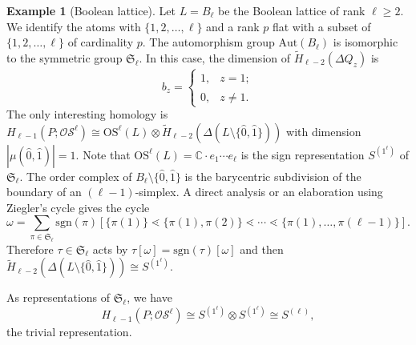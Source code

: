 \documentclass{amsart}
\numberwithin{equation}{section}
\theoremstyle{plain}
\theoremstyle{remark}
\theoremstyle{definition}
\newtheorem{ex}[thm]{Example}
\numberwithin{equation}{section}
\newcommand{\C}{\mathbb{C}}
\newcommand{\OS}{\mathrm{OS}}
\newcommand{\sOS}{\mathscr{OS}}
\begin{document}
\begin{ex}[Boolean lattice]
    Let $L=B_\ell$ be the Boolean lattice of rank $\ell\geq 2$. We identify the atoms with $\{1,2,\ldots,\ell\}$ and a rank $p$ flat with a subset of $\{1,2,\ldots,\ell\}$ of cardinality $p$. The automorphism group $\mathrm{Aut}(B_\ell)$ is isomorphic to the symmetric group $\mathfrak{S}_\ell$. In this case, the dimension of $\widetilde{H}_{\ell-2}(\Delta Q_z)$ is
    \[
    b_z=\begin{cases}
        1, & z=\hat{1};\\
        0, & z\neq\hat 1.
    \end{cases}
    \]
    The only interesting homology is $H_{\ell-1}(P;\sOS^\ell)\cong \OS^\ell(L)\otimes \widetilde{H}_{\ell-2}(\Delta(L\setminus\{\hat 0,\hat 1\}))$ with dimension $|\mu(\hat0,\hat1)|=1$. 
    Note that $\OS^\ell(L)=\C\cdot e_1\cdots e_\ell$ is the sign representation $S^{(1^\ell)}$ of $\mathfrak{S}_\ell$. The order complex of $B_\ell\setminus\{\hat0,\hat1\}$ is the barycentric subdivision of the boundary of an $(\ell-1)$-simplex. A direct analysis or an elaboration using Ziegler's cycle gives the cycle
    \[
    \omega=\sum_{\pi\in\mathfrak{S}_\ell}\mathrm{sgn}(\pi)[\{\pi(1)\}\lessdot\{\pi(1),\pi(2)\}\lessdot\cdots\lessdot\{\pi(1),\ldots,\pi(\ell-1)\}].
    \]
    Therefore $\tau\in\mathfrak{S}_\ell$ acts by $\tau[\omega]=\mathrm{sgn}(\tau)[\omega]$ and then $\widetilde{H}_{\ell-2}(\Delta(L\setminus\{\hat 0,\hat 1\}))\cong S^{(1^\ell)}$.
    
    As representations of $\mathfrak{S}_\ell$, we have
    \[
    H_{\ell-1}(P;\sOS^\ell)\cong S^{(1^\ell)}\otimes S^{(1^\ell)}\cong S^{(\ell)},
    \]
    the trivial representation.
\end{ex}
\end{document}
